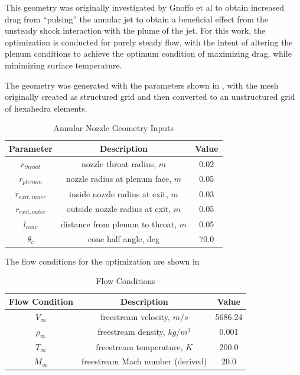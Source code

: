 This geometry was originally investigated by Gnoffo et
al\cite{gnoffo2016tapping} to obtain increased drag from ``pulsing'' the annular
jet to obtain a beneficial effect from the unsteady shock interaction with the
plume of the jet.  For this work, the optimization is conducted for purely steady
flow, with the intent of altering the plenum conditions to achieve the optimum
condition of maximizing drag, while minimizing surface temperature.

The geometry was generated with the parameters shown in ,
with the mesh originally created as structured grid and then converted to an
unstructured grid of hexahedra elements.
\begin{table}[h]
  \centering
  \begin{tabular}{c|c|c}
    Parameter & Description & Value \\
    \hline
    $r_{throat}$       &   nozzle throat radius, $m$           & 0.02 \\
    $r_{plenum}$       &   nozzle radius at plenum face, $m$   & 0.05 \\
    $r_{exit,inner}$   &   inside nozzle radius at exit, $m$   & 0.03 \\
    $r_{exit,outer}$   &   outside nozzle radius at exit, $m$  & 0.05 \\
    $l_{conv}$         &   distance from plenum to throat, $m$  & 0.05 \\
    $\theta_c$         &   cone half angle, deg                & 70.0
  \end{tabular}
  \caption{Annular Nozzle Geometry Inputs}
  \label{tab:annular-geom}
\end{table}
The flow conditions for the optimization are shown in 
\begin{table}[!h]
  \centering
  \begin{tabular}{c|c|c}
    Flow Condition & Description & Value \\
    \hline
    $V_{\infty}$    & freestream velocity, $m/s$        & 5686.24 \\
    $\rho_{\infty}$ & freestream density, $kg/m^3$      & 0.001 \\
    $T_{\infty}$    & freestream temperature, $K$       & 200.0 \\
    $M_{\infty}$    & freestream Mach number (derived)  & 20.0
  \end{tabular}
  \caption{Flow Conditions}
  \label{tab:flow-conditions}
\end{table}

